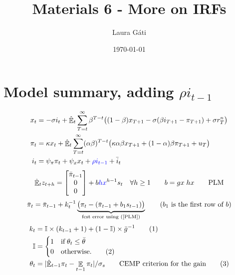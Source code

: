 \documentclass[11pt]{article}
\renewcommand{\[}{\begin{equation}}
\renewcommand{\]}{\end{equation}}
\DeclareMathOperator{\E}{\mathbb{E}}
\newcommand\numberthis{\addtocounter{equation}{1}\tag{\theequation}} %
\begin{document}
\linespread{1.0}

\title{Materials 6 - More on IRFs}
\author{Laura G\'ati} 
\date{\today}
\maketitle


\tableofcontents




\newpage
\section{Model summary, adding $\rho i_{t-1}$}
\begin{align}
x_t &=  -\sigma i_t +\hat{\E}_t \sum_{T=t}^{\infty} \beta^{T-t }\big( (1-\beta)x_{T+1} - \sigma(\beta i_{T+1} - \pi_{T+1}) +\sigma r_T^n \big)  \label{prestons18}  \\
\pi_t &= \kappa x_t +\hat{\E}_t \sum_{T=t}^{\infty} (\alpha\beta)^{T-t }\big( \kappa \alpha \beta x_{T+1} + (1-\alpha)\beta \pi_{T+1} + u_T\big) \label{prestons19}  \\
i_t &= \psi_{\pi}\pi_t + \psi_{x} x_t  + \textcolor{blue}{\rho i_{t-1}} + \bar{i}_t \label{TR}
\end{align}
\begin{equation}
\hat{\E}_t z_{t+h} =  \begin{bmatrix}\bar{\pi}_{t-1} \\ 0 \\ 0 \end{bmatrix}+ b\textcolor{blue}{hx}^{h-1}s_t  \quad \forall h\geq 1 \quad \quad b = gx \; hx \quad \quad \text{PLM} \label{PLM}
\end{equation}
\begin{equation}
\bar{\pi}_{t} = \bar{\pi}_{t-1} +k_t^{-1}\underbrace{\big(\pi_{t} -(\bar{\pi}_{t-1}+b_1s_{t-1}) \big)}_{\text{fcst error using (\ref{PLM})} } \quad \quad  \text{($b_1$ is the first row of $b$)}
\end{equation}
 \begin{align*}
k_t & = \mathbb{I}\times(k_{t-1}+1) + (1-\mathbb{I}) \times \bar{g}^{-1}  \label{gain} \numberthis\\
\mathbb{I} & = \begin{cases} 1 \quad \text{if} \; \theta_t \leq \bar{\theta}  \\ 0 \quad \text{otherwise.}\numberthis
\end{cases} \\
\theta_t & = |\hat{\E}_{t-1}\pi_t - \E_{t-1}\pi_t| / \sigma_s \quad \quad \text{CEMP criterion for the gain}\label{criterion}\numberthis
\end{align*}
\end{document}
